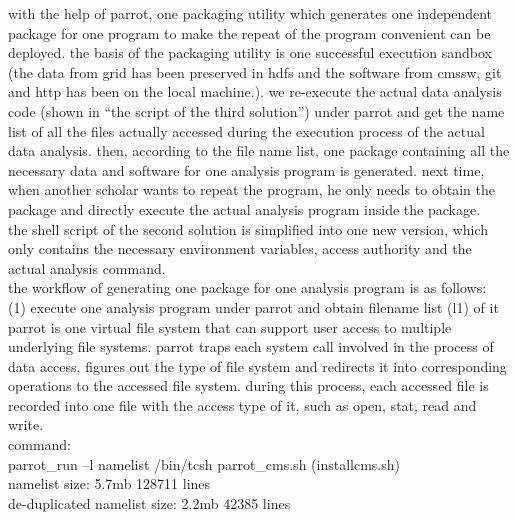 \documentclass{article}
\begin{document}
with the help of parrot, one packaging utility which generates one independent package for one program to make the repeat of the program convenient can be deployed. the basis of the packaging utility is one successful execution sandbox (the data from grid has been preserved in hdfs and the software from cmssw, git and http has been on the local machine.). we re-execute the actual data analysis code (shown in “the script of the third solution”) under parrot and get the name list of all the files actually accessed during the execution process of the actual data analysis. then, according to the file name list, one package containing all the necessary data and software for one analysis program is generated. next time, when another scholar wants to repeat the program, he only needs to obtain the package and directly execute the actual analysis program inside the package.\\

the shell script of the second solution is simplified into one new version, which only contains the necessary environment variables, access authority and the actual analysis command.\\

the workflow of generating one package for one analysis program  is as follows: \\
(1) execute one analysis program under parrot and obtain filename list (l1) of it\\
parrot is one virtual file system that can support user access to multiple underlying file systems. parrot traps each system call involved in the process of data access, figures out the type of file system and redirects it into corresponding operations to the accessed file system. during this process, each accessed file is recorded into one file with the access type of it, such as open, stat, read and write.\\
command:\\
parrot\_run –l namelist /bin/tcsh parrot\_cms.sh (installcms.sh)\\
namelist size: 5.7mb     128711 lines\\
de-duplicated namelist size: 2.2mb   42385 lines\\
\end{document}
